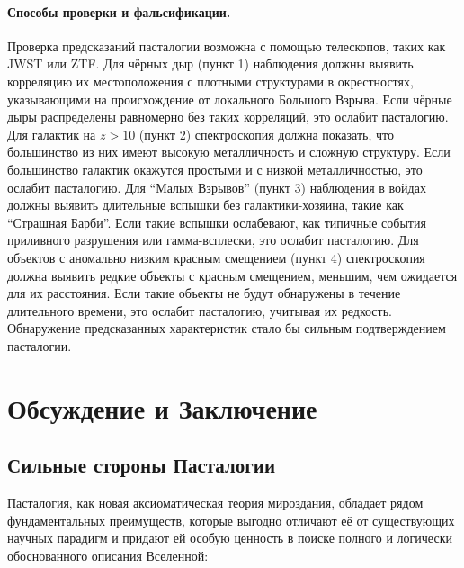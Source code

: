 \documentclass[pdflatex,sn-mathphys-num]{sn-jnl}
\begin{document}
\paragraph{Способы проверки и фальсификации.} Проверка предсказаний пасталогии возможна с помощью телескопов, таких как JWST или ZTF. Для чёрных дыр (пункт 1) наблюдения должны выявить корреляцию их местоположения с плотными структурами в окрестностях, указывающими на происхождение от локального Большого Взрыва. Если чёрные дыры распределены равномерно без таких корреляций, это ослабит пасталогию. Для галактик на \( z > 10 \) (пункт 2) спектроскопия должна показать, что большинство из них имеют высокую металличность и сложную структуру. Если большинство галактик окажутся простыми и с низкой металличностью, это ослабит пасталогию. Для ``Малых Взрывов'' (пункт 3) наблюдения в войдах должны выявить длительные вспышки без галактики-хозяина, такие как ``Страшная Барби''. Если такие вспышки ослабевают, как типичные события приливного разрушения или гамма-всплески, это ослабит пасталогию. Для объектов с аномально низким красным смещением (пункт 4) спектроскопия должна выявить редкие объекты с красным смещением, меньшим, чем ожидается для их расстояния. Если такие объекты не будут обнаружены в течение длительного времени, это ослабит пасталогию, учитывая их редкость. Обнаружение предсказанных характеристик стало бы сильным подтверждением пасталогии.

\section{Обсуждение и Заключение}\label{sec:discussion-conclusion}

\subsection{Сильные стороны Пасталогии}\label{subsec:strengths}

Пасталогия, как новая аксиоматическая теория мироздания, обладает рядом фундаментальных преимуществ, которые выгодно отличают её от существующих научных парадигм и придают ей особую ценность в поиске полного и логически обоснованного описания Вселенной:
\end{document}
